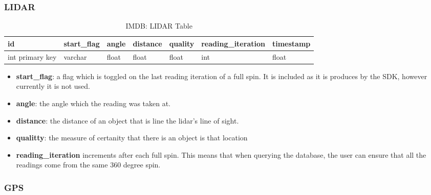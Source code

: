 \subsubsection{LIDAR}
\iffalse
\gls{LIDAR} data read using SDK (C++)
Changed the output to return a JSON format
Python dictionary in this format...
Small error with the last comma breaking the JSON object so used python \lstinline{data.replace(',\n' , ']')} which replaced the last comma with a ]

Lidar class validates the data
 - removes data (angle) which is obscured by the antenna
\fi



\begin{table}[!htb]
\centering
\begin{tabular}{|l|l|l|l|l|l|l|}
\hline
id              & start\_flag & angle & distance & quality & reading\_iteration & timestamp \\ \hline
int primary key & varchar     & float & float    & float   & int            & float\\ \hline
\end{tabular}
\caption{IMDB: LIDAR Table}
\label{tab:db-lidar}
\end{table}
\begin{itemize}
\item{\textbf{start\_flag}}: a flag which is toggled on the last reading iteration of a full spin. It is included as it is produces by the SDK, however currently it is not used.
\item{\textbf{angle}}: the angle which the reading was taken at.
\item{\textbf{distance}}: the distance of an object that is line the lidar's line of sight.
\item{\textbf{qualitty}}: the measure of certanity that there is an object is that location
\item{\textbf{reading\_iteration}} increments after each full spin. This means that when querying the database, the user can ensure that all the readings come from the same 360 degree spin.
\end{itemize}


\subsubsection{GPS}

